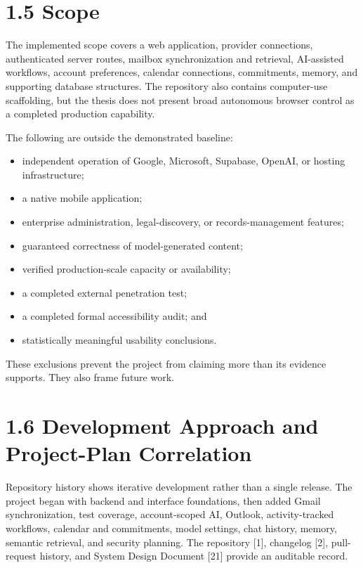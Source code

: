 \documentclass[
]{report}
\providecommand{\tightlist}{%
  \setlength{\itemsep}{0pt}\setlength{\parskip}{0pt}}
\begin{document}
\section{1.5 Scope}\label{15-scope}

The implemented scope covers a web application, provider connections,
authenticated server routes, mailbox synchronization and retrieval,
AI-assisted workflows, account preferences, calendar connections,
commitments, memory, and supporting database structures. The repository
also contains computer-use scaffolding, but the thesis does not present
broad autonomous browser control as a completed production capability.

The following are outside the demonstrated baseline:

\begin{itemize}
\tightlist
\item
  independent operation of Google, Microsoft, Supabase, OpenAI, or
  hosting infrastructure;
\item
  a native mobile application;
\item
  enterprise administration, legal-discovery, or records-management
  features;
\item
  guaranteed correctness of model-generated content;
\item
  verified production-scale capacity or availability;
\item
  a completed external penetration test;
\item
  a completed formal accessibility audit; and
\item
  statistically meaningful usability conclusions.
\end{itemize}

These exclusions prevent the project from claiming more than its
evidence supports. They also frame future work.

\section{1.6 Development Approach and Project-Plan
Correlation}\label{16-development-approach-and-project-plan-correlation}

Repository history shows iterative development rather than a single
release. The project began with backend and interface foundations, then
added Gmail synchronization, test coverage, account-scoped AI, Outlook,
activity-tracked workflows, calendar and commitments, model settings,
chat history, memory, semantic retrieval, and security planning. The
repository {[}1{]}, changelog {[}2{]}, pull-request history, and System
Design Document {[}21{]} provide an auditable record.
\end{document}
